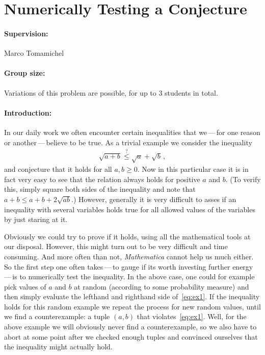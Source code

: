 \documentclass[aps,pra,onecolumn,nofootinbib,superscriptaddress,tightenlines,
notitlepage,12pt]{revtex4-1}
\begin{document}
\section{Numerically Testing a Conjecture}

\paragraph*{Supervision:} Marco Tomamichel

\paragraph*{Group size:} Variations of this problem are possible, for up to 3 students in total.

\paragraph*{Introduction:} In our daily work we often encounter certain inequalities that we\,---\,for one reason or another\,---\,believe to be true. 
%
As a trivial example we consider the inequality
\begin{align}
  \sqrt{a + b} \stackrel{?}{\leq} \sqrt{a} + \sqrt{b} \,, \label{eq:ex1}
\end{align}
and conjecture that it holds for all $a, b \geq 0$.
Now in this particular case it is in fact very easy to see that the relation always holds for positive $a$ and $b$. (To verify this, simply  square both sides of the inequality and note that $a + b \leq a + b + 2\sqrt{ab}$.) However, generally it is very difficult to asses if an inequality with several variables holds true for all allowed values of the variables by just staring at it. 

Obviously we could try to prove if it holds, using all the mathematical tools at our disposal. However, this might turn out to be very difficult and time consuming. And more often than not, \emph{Mathematica} cannot help us much either.
%
So the first step one often takes\,---\,to gauge if its worth investing further energy\,---\,is to numerically test the inequality. In the above case, one could for example pick values of $a$ and $b$ at random (according to some probability measure) and then simply evaluate the lefthand and righthand side of~\eqref{eq:ex1}. If the inequality holds for this random example we repeat the process for new random values, until we find a counterexample: a tuple $(a,b)$ that violates~\eqref{eq:ex1}. Well, for the above example we will obviously never find a counterexample, so we also have to abort at some point after we checked enough tuples and convinced ourselves that the inequality might actually hold.
\end{document}
